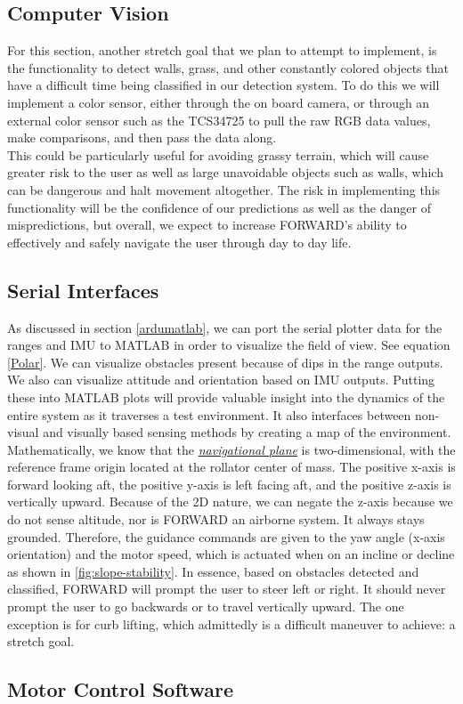 \subsection{Computer Vision}
\noindent For this section, another stretch goal that we plan to attempt to implement, is the functionality to detect walls, grass, and other constantly colored objects that have a difficult time being classified in our detection system. To do this we will implement a color sensor, either through the on board camera, or through an external color sensor such as the TCS34725 to pull the raw RGB data values, make comparisons, and then pass the data along. \\

\noindent This could be particularly useful for avoiding grassy terrain, which will cause greater risk to the user as well as large unavoidable objects such as walls, which can be dangerous and halt movement altogether. The risk in implementing this functionality will be the confidence of our predictions as well as the danger of mispredictions, but overall, we expect to increase FORWARD's ability to effectively and safely navigate the user through day to day life. \\


\subsection{Serial Interfaces}
\noindent As discussed in section \ref{ardumatlab}, we can port the serial plotter data for the ranges and IMU to MATLAB in order to visualize the field of view. See equation \ref{Polar}. We can visualize obstacles present because of dips in the range outputs. We also can visualize attitude and orientation based on IMU outputs. Putting these into MATLAB plots will provide valuable insight into the dynamics of the entire system as it traverses a test environment. It also interfaces between non-visual and visually based sensing methods by creating a map of the environment.\\

\noindent Mathematically, we know that the \underline{\textit{navigational plane}} is two-dimensional, with the reference frame origin located at the rollator center of mass. The positive x-axis is forward looking aft, the positive y-axis is left facing aft, and the positive z-axis is vertically upward. Because of the 2D nature, we can negate the z-axis because we do not sense altitude, nor is FORWARD an airborne system. It always stays grounded. Therefore, the guidance commands are given to the yaw angle (x-axis orientation) and the motor speed, which is actuated when on an incline or decline as shown in \ref{fig:slope-stability}. In essence, based on obstacles detected and classified, FORWARD will prompt the user to steer left or right. It should never prompt the user to go backwards or to travel vertically upward. The one exception is for curb lifting, which admittedly is a difficult maneuver to achieve: a stretch goal.\\

\subsection{Motor Control Software}


\\